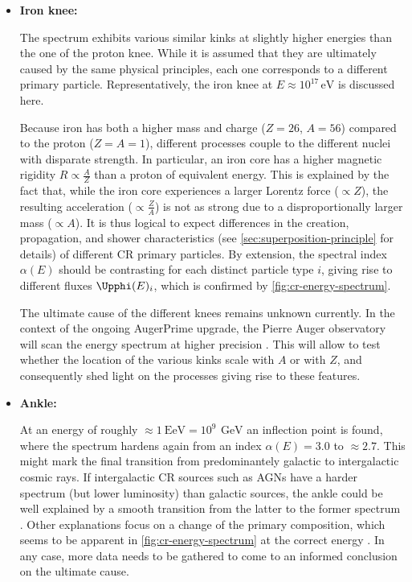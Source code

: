 \begin{itemize}
\item \textbf{Iron knee:}

The spectrum exhibits various similar kinks at slightly higher energies than the one of the proton knee. While it is assumed that they are ultimately caused by the 
same physical principles, each one corresponds to a different primary particle. Representatively, the iron knee at $E \approx 10^{17}\,\text{eV}$ is discussed here. 

Because iron has both a higher mass and charge ($Z = 26$, $A = 56$) compared to the proton ($Z = A = 1$), different processes couple to the different nuclei with 
disparate strength. In particular, an iron core has a higher magnetic rigidity $R \propto \frac{A}{Z}$ than a proton of equivalent energy. This is explained by the
fact that, while the iron core experiences a larger Lorentz force ($\propto Z$), the resulting acceleration ($\propto \frac{Z}{A}$) is not as strong due to a
disproportionally larger mass ($\propto A$). It is thus logical to expect differences in the creation, propagation, and shower characteristics 
(see \autoref{sec:superposition-principle} for details) of different CR primary particles. By extension, the spectral index $\alpha(E)$ should be contrasting for 
each distinct particle type $i$, giving rise to different fluxes $\Upphi(E)_i$, which is confirmed by \autoref{fig:cr-energy-spectrum}.

The ultimate cause of the different knees remains unknown currently. In the context of the ongoing AugerPrime upgrade, the Pierre Auger observatory will scan the
energy spectrum at higher precision \cite{castellina2019augerprime}. This will allow to test whether the location of the various kinks scale with $A$ or with $Z$, 
and consequently shed light on the processes giving rise to these features.

\item \textbf{Ankle:}

At an energy of roughly $\approx\SI{1}{\exa\electronvolt} = 10^9\,\SI{}{\giga\electronvolt}$ an inflection point is found, where the spectrum hardens again from an 
index $\alpha(E) = 3.0$ to $\approx 2.7$. This might mark the final transition from predominantely galactic to intergalactic cosmic rays. If intergalactic CR 
sources such as AGNs have a harder spectrum (but lower luminosity) than galactic sources, the ankle could be well explained by a smooth transition from the latter to 
the former spectrum \cite{aloisio2007dip}. Other explanations focus on a change of the primary composition, which seems to be apparent in 
\autoref{fig:cr-energy-spectrum} at the correct energy \cite{allard2012extragalactic}. In any case, more data needs to be gathered to come to an informed 
conclusion on the ultimate cause.


\end{itemize}
